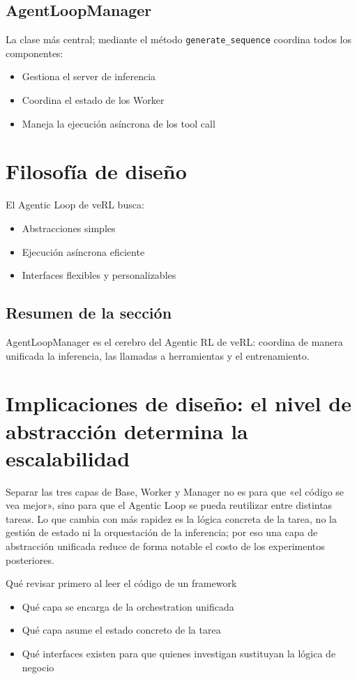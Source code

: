 \documentclass[a4paper]{article}
\begin{document}
\subsection{AgentLoopManager}
La clase más central; mediante el método \texttt{generate\_sequence} coordina todos los componentes:
\begin{itemize}
  \item Gestiona el server de inferencia
  \item Coordina el estado de los Worker
  \item Maneja la ejecución asíncrona de los tool call
\end{itemize}

\section{Filosofía de diseño}
El Agentic Loop de veRL busca:
\begin{itemize}
  \item Abstracciones simples
  \item Ejecución asíncrona eficiente
  \item Interfaces flexibles y personalizables
\end{itemize}

\subsection{Resumen de la sección}
AgentLoopManager es el cerebro del Agentic RL de veRL: coordina de manera unificada la inferencia, las llamadas a herramientas y el entrenamiento.

\newpage
\section{Implicaciones de diseño: el nivel de abstracción determina la escalabilidad}
Separar las tres capas de Base, Worker y Manager no es para que «el código se vea mejor», sino para que el Agentic Loop se pueda reutilizar entre distintas tareas. Lo que cambia con más rapidez es la lógica concreta de la tarea, no la gestión de estado ni la orquestación de la inferencia; por eso una capa de abstracción unificada reduce de forma notable el costo de los experimentos posteriores.

\begin{knowledgebox}{Qué revisar primero al leer el código de un framework}
\begin{itemize}
  \item Qué capa se encarga de la orchestration unificada
  \item Qué capa asume el estado concreto de la tarea
  \item Qué interfaces existen para que quienes investigan sustituyan la lógica de negocio
\end{itemize}
\end{knowledgebox}
\end{document}
